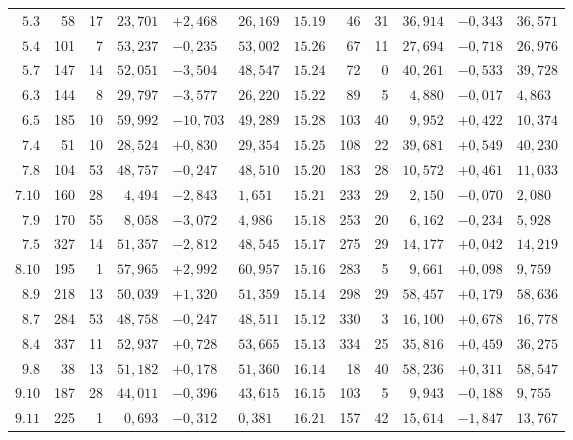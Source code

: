 \documentclass[12pt,a4paper]{article}
\theoremstyle{plain}
\theoremstyle{definition}
\theoremstyle{remark}
\begin{document}
\begin{center}
\begin{tabular}{r|r|r|r|l|l|r|r|r|r|l|l}
$5.3$ & 58 & 17 & $23{,}701$ & $+2{,}468$ & $26{,}169$ & $15.19$ & 46 & 31 & $36{,}914$ & $-0{,}343$ & $36{,}571$\\
$5.4$ & 101 & 7 & $53{,}237$ & $-0{,}235$ & $53{,}002$ & $15.26$ & 67 & 11 & $27{,}694$ & $-0{,}718$ & $26{,}976$\\
$5.7$ & 147 & 14 & $52{,}051$ & $-3{,}504$ & $48{,}547$ & $15.24$ & 72 & 0 & $40{,}261$ & $-0{,}533$ & $39{,}728$\\
$6.3$ & 144 & 8 & $29{,}797$ & $-3{,}577$ & $26{,}220$ & $15.22$ & 89 & 5 & $4{,}880$ & $-0{,}017$ & $4{,}863$\\
$6.5$ & 185 & 10 & $59{,}992$ & $-10{,}703$ & $49{,}289$ & $15.28$ & 103 & 40 & $9{,}952$ & $+0{,}422$ & $10{,}374$\\
$7.4$ & 51 & 10 & $28{,}524$ & $+0{,}830$ & $29{,}354$ & $15.25$ & 108 & 22 & $39{,}681$ & $+0{,}549$ & $40{,}230$\\
$7.8$ & 104 & 53 & $48{,}757$ & $-0{,}247$ & $48{,}510$ & $15.20$ & 183 & 28 & $10{,}572$ & $+0{,}461$ & $11{,}033$\\
$7.10$ & 160 & 28 & $4{,}494$ & $-2{,}843$ & $1{,}651$ & $15.21$ & 233 & 29 & $2{,}150$ & $-0{,}070$ & $2{,}080$\\
$7.9$ & 170 & 55 & $8{,}058$ & $-3{,}072$ & $4{,}986$ & $15.18$ & 253 & 20 & $6{,}162$ & $-0{,}234$ & $5{,}928$\\
$7.5$ & 327 & 14 & $51{,}357$ & $-2{,}812$ & $48{,}545$ & $15.17$ & 275 & 29 & $14{,}177$ & $+0{,}042$ & $14{,}219$\\
$8.10$ & 195 & 1 & $57{,}965$ & $+2{,}992$ & $60{,}957$ & $15.16$ & 283 & 5 & $9{,}661$ & $+0{,}098$ & $9{,}759$\\
$8.9$ & 218 & 13 & $50{,}039$ & $+1{,}320$ & $51{,}359$ & $15.14$ & 298 & 29 & $58{,}457$ & $+0{,}179$ & $58{,}636$\\
$8.7$ & 284 & 53 & $48{,}758$ & $-0{,}247$ & $48{,}511$ & $15.12$ & 330 & 3 & $16{,}100$ & $+0{,}678$ & $16{,}778$\\
$8.4$ & 337 & 11 & $52{,}937$ & $+0{,}728$ & $53{,}665$ & $15.13$ & 334 & 25 & $35{,}816$ & $+0{,}459$ & $36{,}275$\\
$9.8$ & 38 & 13 & $51{,}182$ & $+0{,}178$ & $51{,}360$ & $16.14$ & 18 & 40 & $58{,}236$ & $+0{,}311$ & $58{,}547$\\
$9.10$ & 187 & 28 & $44{,}011$ & $-0{,}396$ & $43{,}615$ & $16.15$ & 103 & 5 & $9{,}943$ & $-0{,}188$ & $9{,}755$\\
$9.11$ & 225 & 1 & $0{,}693$ & $-0{,}312$ & $0{,}381$ & $16.21$ & 157 & 42 & $15{,}614$ & $-1{,}847$ & $13{,}767$\\

\end{tabular}
\end{center}
\end{document}
